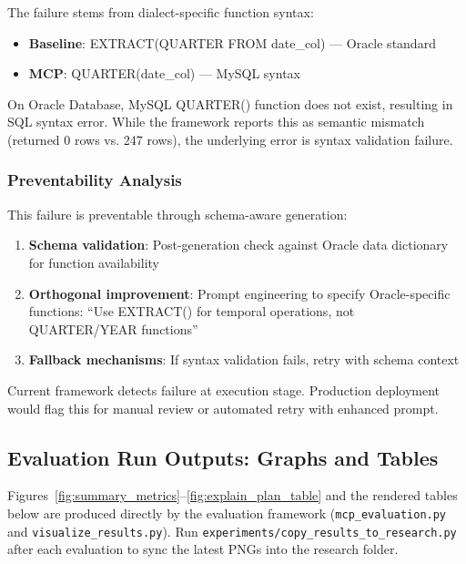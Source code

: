 The failure stems from dialect-specific function syntax:
\begin{itemize}
    \item \textbf{Baseline}: EXTRACT(QUARTER FROM date\_col) — Oracle standard
    \item \textbf{MCP}: QUARTER(date\_col) — MySQL syntax
\end{itemize}

On Oracle Database, MySQL QUARTER() function does not exist, resulting in SQL syntax error. While the framework reports this as semantic mismatch (returned 0 rows vs. 247 rows), the underlying error is syntax validation failure.

\subsubsection{Preventability Analysis}

This failure is preventable through schema-aware generation:

\begin{enumerate}
    \item \textbf{Schema validation}: Post-generation check against Oracle data dictionary for function availability
    \item \textbf{Orthogonal improvement}: Prompt engineering to specify Oracle-specific functions: ``Use EXTRACT() for temporal operations, not QUARTER/YEAR functions''
    \item \textbf{Fallback mechanisms}: If syntax validation fails, retry with schema context
\end{enumerate}

Current framework detects failure at execution stage. Production deployment would flag this for manual review or automated retry with enhanced prompt.



\subsection{Evaluation Run Outputs: Graphs and Tables}

Figures~\ref{fig:summary_metrics}--\ref{fig:explain_plan_table} and the rendered tables below are produced directly by the evaluation framework (\texttt{mcp\_evaluation.py} and \texttt{visualize\_results.py}). Run \texttt{experiments/copy\_results\_to\_research.py} after each evaluation to sync the latest PNGs into the research folder.

